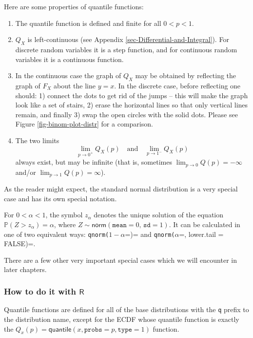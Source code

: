 \documentclass[captions=tableheading]{scrbook}
\begin{document}
\begin{rem}
Here are some properties of quantile functions:
\begin{enumerate}
\item The quantile function is defined and finite for all \(0<p<1\).
\item \(Q_{X}\) is left-continuous (see Appendix \ref{sec-Differential-and-Integral}). For discrete random variables it is a step function, and for continuous random variables it is a continuous function.
\item In the continuous case the graph of \(Q_{X}\) may be obtained by reflecting the graph of \(F_{X}\) about the line \(y=x\). In the discrete case, before reflecting one should: 1) connect the dots to get rid of the jumps -- this will make the graph look like a set of stairs, 2) erase the horizontal lines so that only vertical lines remain, and finally 3) swap the open circles with the solid dots. Please see Figure \ref{fig-binom-plot-distr} for a comparison.
\item The two limits
   \[
   \lim_{p\to0^{+}}Q_{X}(p)\quad\mbox{and}\quad\lim_{p\to1^{-}}Q_{X}(p)
   \]
   always exist, but may be infinite (that is, sometimes \(\lim_{p\to0}Q(p)=-\infty\) and/or \(\lim_{p\to1}Q(p)=\infty\)).
\end{enumerate}

\end{rem}

As the reader might expect, the standard normal distribution is a very special case and has its own special notation.

\begin{defn}
For \(0<\alpha<1\), the symbol \(z_{\alpha}\) denotes the unique solution of the equation \(\mathbb{P}(Z>z_{\alpha})=\alpha\), where \(Z\sim\mathsf{norm}(\mathtt{mean}=0,\,\mathtt{sd}=1)\). It can be calculated in one of two equivalent ways: \texttt{qnorm(}\(1-\alpha\)=)= and \texttt{qnorm(}\(\alpha\)=, lower.tail = FALSE)=. 
\end{defn}

There are a few other very important special cases which we will encounter in later chapters. 
\subsubsection{How to do it with \(\mathsf{R}\)}
\label{sec-1-3-1-1}


Quantile functions are defined for all of the base distributions with the \texttt{q} prefix to the distribution name, except for the ECDF whose quantile function is exactly the \( Q_{x}(p) = \mathsf{quantile}(x, \mathtt{probs} = p, \mathtt{type} = 1) \) function. 
\end{document}
